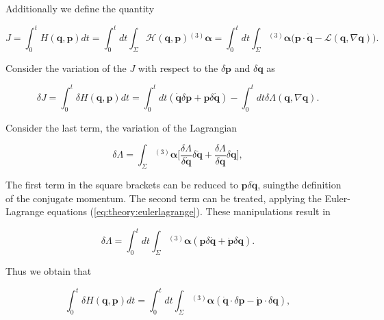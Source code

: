 \documentclass[11pt,a4paper,headinclude=true,DIV=14,BCOR=8mm,chapterprefix,listof=totoc,twoside,openright,abstracton]{scrbook}
\begin{document}
Additionally we define the quantity 

\begin{equation}
    J = \int_{0}^{t}H(\boldsymbol{q},\boldsymbol{p})dt = \int_{0}^{t}dt\int_{\Sigma}\mathcal{H}(\boldsymbol{q},\boldsymbol{p}){^{(3)}\boldsymbol{\alpha}} = \int_{0}^{t}dt\int_{\Sigma}{^{(3)}\boldsymbol{\alpha}}\Big(\boldsymbol{p}\cdot\dot{\boldsymbol{q}} - \mathcal{L}(\boldsymbol{q},\nabla\boldsymbol{q})\Big).
\end{equation}

Consider the variation of the $J$ with respect to the $\delta\boldsymbol{p}$ and $\delta\boldsymbol{q}$ as

\begin{equation}
    \delta J = \int_{0}^{t}\delta H(\boldsymbol{q},\boldsymbol{p})dt = \int_{0}^{t}dt (\dot{\boldsymbol{q}}\delta\boldsymbol{p}+\boldsymbol{p}\delta\dot{\boldsymbol{q}}) - \int_{0}^{t}dt\delta\Lambda(\boldsymbol{q}, \nabla\boldsymbol{q}).
\end{equation}

Consider the last term, the variation of the Lagrangian 

\begin{equation}
    \delta\Lambda = \int_{\Sigma}{^{(3)}\boldsymbol{\alpha}}\Bigg[\frac{\delta\Lambda}{\delta\dot{\boldsymbol{q}}}\delta\dot{\boldsymbol{q}}+\frac{\delta\Lambda}{\delta\boldsymbol{q}}\delta\boldsymbol{q}\Bigg],
\end{equation}

The first term in the square brackets can be reduced to $\boldsymbol{p}\delta\dot{\boldsymbol{q}}$, suingthe definition of the conjugate momentum. The second term can be treated, applying the Euler-Lagrange equations (\ref{eq:theory:eulerlagrange}). These manipulations result in

\begin{equation}
    \delta\Lambda = \int_{0}^{t}dt\int_{\Sigma}{^{(3)}\boldsymbol{\alpha}}(\boldsymbol{p}\delta\dot{\boldsymbol{q}} + \dot{\boldsymbol{p}}\delta\boldsymbol{q}).
\end{equation}

Thus we obtain that 

\begin{equation}
    \int_{0}^{t} \delta H(\boldsymbol{q},\boldsymbol{p})dt =   \int_{0}^{t}dt\int_{\Sigma}{^{(3)}\boldsymbol{\alpha}}(\dot{\boldsymbol{q}}\cdot\delta\boldsymbol{p}-\dot{\boldsymbol{p}}\cdot\delta\boldsymbol{q}),
\end{equation}
\end{document}
